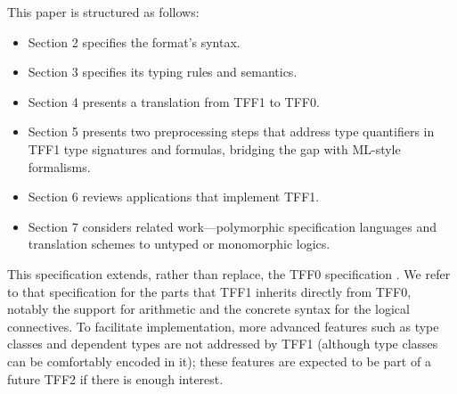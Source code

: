 This paper is structured as follows:
\begin{itemize}
\item Section 2 specifies the format's syntax.
\item Section 3 specifies its typing rules and semantics.
\item Section 4 presents a translation from TFF1 to TFF0.
\item Section 5 presents two preprocessing steps that address type quantifiers
in TFF1 type signatures and formulas, bridging the gap with ML-style
formalisms. %
\item Section 6 reviews applications that implement TFF1.
\item Section 7 considers related work---polymorphic specification languages
and translation schemes to untyped or monomorphic logics.
\end{itemize}

This specification extends, rather than replace, the TFF0 specification
\cite{TFF0}. We refer to that specification for the parts that TFF1 inherits
directly from TFF0, notably the support for arithmetic and the concrete syntax
for the logical connectives.
%
To facilitate implementation, more advanced features such as type classes and
dependent types are not addressed by TFF1 (although type classes can be
comfortably encoded in it); these features are expected to be part of a
future TFF2 if there is enough interest.
